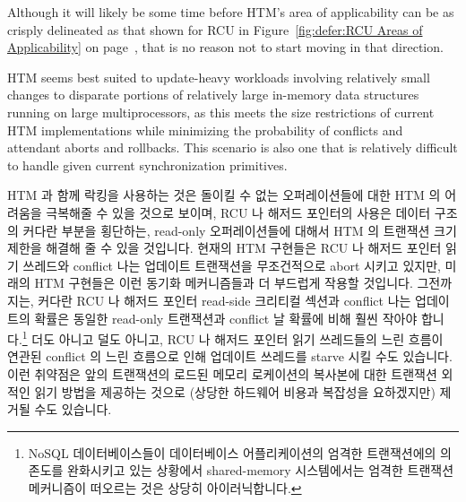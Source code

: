 Although it will likely be some time before HTM's area of applicability
can be as crisply delineated as that shown for RCU in
Figure~\ref{fig:defer:RCU Areas of Applicability} on
page~\pageref{fig:defer:RCU Areas of Applicability}, that is no reason not to
start moving in that direction.

HTM seems best suited to update-heavy workloads involving relatively
small changes to disparate portions of relatively large in-memory
data structures running on large multiprocessors,
as this meets the size restrictions of current HTM implementations while
minimizing the probability of conflicts and attendant aborts and
rollbacks.
This scenario is also one that is relatively difficult to handle given
current synchronization primitives.
\fi

HTM 과 함께 락킹을 사용하는 것은 돌이킬 수 없는 오퍼레이션들에 대한 HTM 의
어려움을 극복해줄 수 있을 것으로 보이며, RCU 나 해저드 포인터의 사용은 데이터
구조의 커다란 부분을 횡단하는, read-only 오퍼레이션들에 대해서 HTM 의 트랜잭션
크기 제한을 해결해 줄 수 있을 것입니다.
현재의 HTM 구현들은 RCU 나 해저드 포인터 읽기 쓰레드와 conflict 나는 업데이트
트랜잭션을 무조건적으로 abort 시키고 있지만, 미래의 HTM 구현들은 이런 동기화
메커니즘들과 더 부드럽게 작용할 것입니다.
그전까지는, 커다란 RCU 나 해저드 포인터 read-side 크리티컬 섹션과 conflict 나는
업데이트의 확률은 동일한 read-only 트랜잭션과 conflict 날 확률에 비해 훨씬
작아야 합니다.\footnote{
	NoSQL 데이터베이스들이 데이터베이스 어플리케이션의 엄격한 트랜잭션에의
	의존도를 완화시키고 있는 상황에서 shared-memory 시스템에서는 엄격한
	트랜잭션 메커니즘이 떠오르는 것은 상당히 아이러닉합니다.}
더도 아니고 덜도 아니고, RCU 나 해저드 포인터 읽기 쓰레드들의 느린 흐름이
연관된 conflict 의 느린 흐름으로 인해 업데이트 쓰레드를 starve 시킬 수도
있습니다.
이런 취약점은 앞의 트랜잭션의 로드된 메모리 로케이션의 복사본에 대한 트랜잭션
외적인 읽기 방법을 제공하는 것으로 (상당한 하드웨어 비용과 복잡성을 요하겠지만)
제거될 수도 있습니다.
\iffalse

